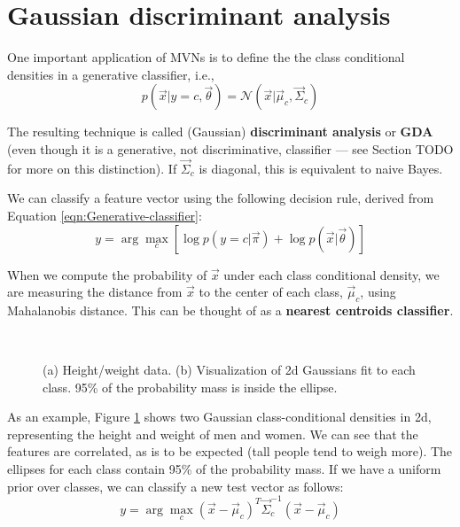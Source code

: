 \section{Gaussian discriminant analysis}
One important application of MVNs is to define the the class conditional densities in a generative classifier, i.e.,
\begin{equation}
p(\vec{x}|y=c,\vec{\theta})=\mathcal{N}(\vec{x}|\vec{\mu}_c,\vec{\Sigma}_c)
\end{equation}

The resulting technique is called (Gaussian) \textbf{discriminant analysis} or \textbf{GDA} (even though it is a generative, not discriminative, classifier — see Section TODO for more on this distinction). If $\vec{\Sigma}_c$ is diagonal, this is equivalent to naive Bayes.

We can classify a feature vector using the following decision rule, derived from Equation \ref{eqn:Generative-classifier}:
\begin{equation}
y=\arg\max_{c} \left[\log p(y=c|\vec{\pi})+\log p(\vec{x}|\vec{\theta})\right]
\end{equation}

When we compute the probability of $\vec{x}$ under each class conditional density, we are measuring the distance from $\vec{x}$ to the center of each class, $\vec{\mu}_c$, using Mahalanobis distance. This can be thought of as a \textbf{nearest centroids classifier}.

\begin{figure}[hbtp]
\centering
{} \\
\caption{(a) Height/weight data. (b) Visualization of 2d Gaussians fit to each class. 95\% of the probability mass is inside the ellipse.}
\label{fig:2d-Gaussians-Visualization} 
\end{figure}

As an example, Figure \ref{fig:2d-Gaussians-Visualization} shows two Gaussian class-conditional densities in 2d, representing the height and weight of men and women. We can see that the features are correlated, as is to be expected (tall people tend to weigh more). The ellipses for each class contain 95\% of the probability mass. If we have a uniform prior over classes, we can classify a new test vector as follows:
\begin{equation}
y=\arg\max_{c} (\vec{x}-\vec{\mu}_c)^T\vec{\Sigma}_c^{-1}(\vec{x}-\vec{\mu}_c)
\end{equation}


